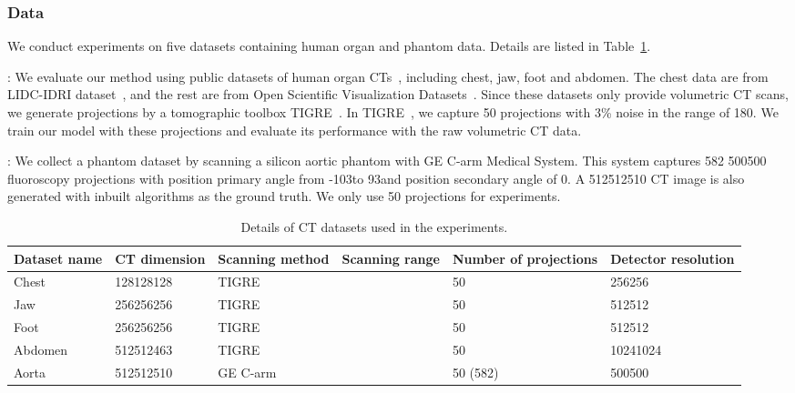 \documentclass[runningheads]{llncs}
\begin{document}
\subsubsection{Data}
We conduct experiments on five datasets containing human organ and phantom data. Details are listed in Table~\ref{tab:dataset}. 

: We evaluate our method using public datasets of human organ CTs~\cite{armato2011lung,Klacansky2022Open}, including chest, jaw, foot and abdomen. The chest data are from LIDC-IDRI dataset~\cite{armato2011lung}, and the rest are from Open Scientific Visualization Datasets~\cite{Klacansky2022Open}. Since these datasets only provide volumetric CT scans, we generate projections by a tomographic toolbox TIGRE~\cite{biguri2016tigre}. In TIGRE~\cite{biguri2016tigre}, we capture 50 projections with 3\% noise in the range of 180\degree. We train our model with these projections and evaluate its performance with the raw volumetric CT data.

: We collect a phantom dataset by scanning a silicon aortic phantom with GE C-arm Medical System. This system captures 582 500500 fluoroscopy projections with position primary angle from -103\degree to 93\degree and position secondary angle of 0\degree. A 512512510 CT image is also generated with inbuilt algorithms as the ground truth. We only use 50 projections for experiments.


\begin{table}[!b]
\scriptsize
\vspace{-2em}
\centering
\caption{Details of CT datasets used in the experiments.}
\label{tab:dataset}
\begin{tabular}{m{}<{\centering}|m{}<{\centering}m{}<{\centering}m{}<{\centering}m{}<{\centering}m{}<{\centering}}
\toprule
Dataset name & CT dimension & Scanning method & Scanning range & Number of projections & Detector resolution \\ \midrule
Chest~\cite{armato2011lung}   & 128128128  & TIGRE~\cite{biguri2016tigre} &  & 50 & 256256 \\
Jaw~\cite{Klacansky2022Open}     & 256256256  & TIGRE~\cite{biguri2016tigre} &  & 50 & 512512 \\
Foot~\cite{Klacansky2022Open}    & 256256256  & TIGRE~\cite{biguri2016tigre} &  & 50 & 512512 \\
Abdomen~\cite{Klacansky2022Open} & 512512463  & TIGRE~\cite{biguri2016tigre} &  & 50 & 10241024 \\
Aorta   & 512512510  & GE C-arm &  & 50 (582) & 500500 \\ \bottomrule
\end{tabular}
\end{table}
\end{document}
